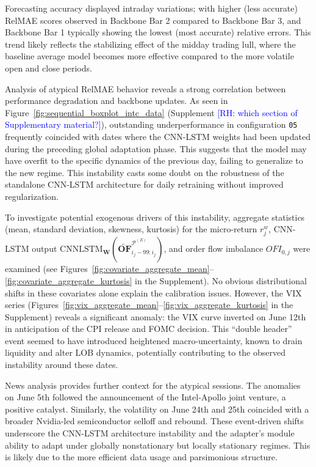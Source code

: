 \documentclass[10pt,a4paper,oneside]{article}
\newcommand{\rh}[1]{\textcolor{blue}{\textsf{[RH: #1]}}}
\begin{document}
Forecasting accuracy displayed intraday variations; with higher (less accurate) RelMAE scores observed in Backbone Bar 2 compared to Backbone Bar 3, and Backbone Bar 1 typically showing the lowest (most accurate) relative errors. This trend likely reflects the stabilizing effect of the midday trading lull, where the baseline average model becomes more effective compared to the more volatile open and close periods.

Analysis of atypical RelMAE behavior reveals a strong correlation between performance degradation and backbone updates. As seen in Figure~\ref{fig:sequential_boxplot_intc_data} (Supplement \rh{which section of Supplementary material?}), outstanding underperformance in configuration \texttt{05} frequently coincided with dates where the CNN-LSTM weights had been updated during the preceding global adaptation phase. This suggests that the model may have overfit to the specific dynamics of the previous day, failing to generalize to the new regime. This instability casts some doubt on the robustness of the standalone CNN-LSTM architecture for daily retraining without improved regularization.

To investigate potential exogenous drivers of this instability, aggregate statistics (mean, standard deviation, skewness, kurtosis) for the micro-return $r^w_j$, CNN-LSTM output $\mathrm{CNNLSTM}_{\mathbf{W}}\!\left(\widetilde{\mathbf{OF}}^{\mathcal{P}^{(E)}}_{i_{j}-99:i_{j}}\right)$, and order flow imbalance $OFI_{0, j}$ were examined (see Figures~\ref{fig:covariate_aggregate_mean}--\ref{fig:covariate_aggregate_kurtosis} in the Supplement). No obvious distributional shifts in these covariates alone explain the calibration issues. However, the VIX series (Figures~\ref{fig:vix_aggregate_mean}--\ref{fig:vix_aggregate_kurtosis} in the Supplement) reveals a significant anomaly: the VIX curve inverted on June 12th in anticipation of the CPI release and FOMC decision. This ``double header'' event seemed to have introduced heightened macro-uncertainty, known to drain liquidity and alter LOB dynamics, potentially contributing to the observed instability around these dates.

News analysis provides further context for the atypical sessions. The anomalies on June 5th followed the announcement of the Intel-Apollo joint venture, a positive catalyst. Similarly, the volatility on June 24th and 25th coincided with a broader Nvidia-led semiconductor selloff and rebound. These event-driven shifts underscore the CNN-LSTM architecture instability and the adapter's module ability to adapt under globally nonstationary but locally stationary regimes. This is likely due to the more efficient data usage and parsimonious structure.
\end{document}
